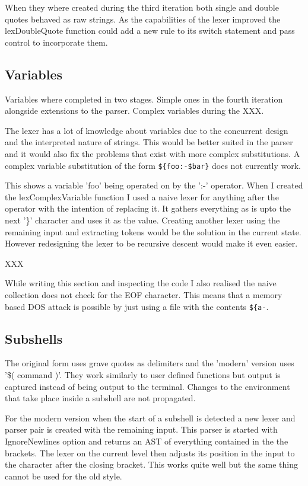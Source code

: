 When they where created during the third iteration both single and double quotes behaved as raw strings.
As the capabilities of the lexer improved the lexDoubleQuote function could add a new rule to its switch statement and pass control to incorporate them.

\subsection{Variables}
Variables where completed in two stages.
Simple ones in the fourth iteration alongside extensions to the parser.
Complex variables during the XXX.

The lexer has a lot of knowledge about variables due to the concurrent design and the interpreted nature of strings.
This would be better suited in the parser and it would also fix the problems that exist with more complex substitutions.
A complex variable substitution of the form \verb!${foo:-$bar}! does not currently work.

This shows a variable 'foo' being operated on by the ':-' operator.
When I created the lexComplexVariable function I used a naive lexer for anything after the operator with the intention of replacing it.
It gathers everything as is upto the next '\}' character and uses it as the value.
Creating another lexer using the remaining input and extracting tokens would be the solution in the current state.
However redesigning the lexer to be recursive descent would make it even easier.

XXX

While writing this section and inspecting the code I also realised the naive collection does not check for the EOF character.
This means that a memory based DOS attack is possible by just using a file with the contents \verb!${a-!.

\subsection{Subshells}
The original form uses grave quotes as delimiters and the 'modern' version uses '\$( command )'.
They work similarly to user defined functions but output is captured instead of being output to the terminal.
Changes to the environment that take place inside a subshell are not propagated. 

For the modern version when the start of a subshell is detected a new lexer and parser pair is created with the remaining input.
This parser is started with IgnoreNewlines option and returns an AST of everything contained in the the brackets.
The lexer on the current level then adjusts its position in the input to the character after the closing bracket.
This works quite well but the same thing cannot be used for the old style.

